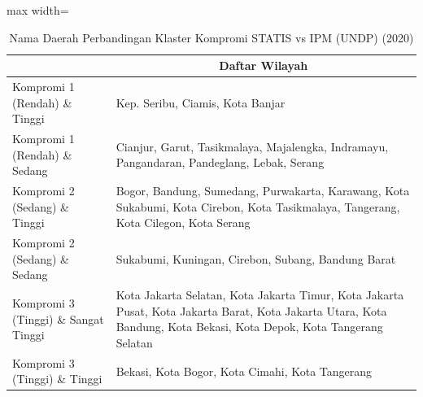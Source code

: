 \begin{table}[H]
\centering
\caption{Nama Daerah Perbandingan Klaster Kompromi STATIS vs IPM (UNDP) (2020)} \label{tab:app2comp_ipm_name_2020}
\begin{adjustbox}{max width=\textwidth}
\begin{tabular}{|>{\centering\arraybackslash}p{4cm}|p{10cm}|}
\hline
\multicolumn{1}{|c|}{\textbf{Kategori}} & \multicolumn{1}{c|}{\textbf{Daftar Wilayah}} \\
\hline
Kompromi 1 (Rendah) \& Tinggi & Kep. Seribu, Ciamis, Kota Banjar \\
\hline
Kompromi 1 (Rendah) \& Sedang & Cianjur, Garut, Tasikmalaya, Majalengka, Indramayu, Pangandaran, Pandeglang, Lebak, Serang \\
\hline
Kompromi 2 (Sedang) \& Tinggi & Bogor, Bandung, Sumedang, Purwakarta, Karawang, Kota Sukabumi, Kota Cirebon, Kota Tasikmalaya, Tangerang, Kota Cilegon, Kota Serang \\
\hline
Kompromi 2 (Sedang) \& Sedang & Sukabumi, Kuningan, Cirebon, Subang, Bandung Barat \\
\hline
Kompromi 3 (Tinggi) \& Sangat Tinggi & Kota Jakarta Selatan, Kota Jakarta Timur, Kota Jakarta Pusat, Kota Jakarta Barat, Kota Jakarta Utara, Kota Bandung, Kota Bekasi, Kota Depok, Kota Tangerang Selatan \\
\hline
Kompromi 3 (Tinggi) \& Tinggi & Bekasi, Kota Bogor, Kota Cimahi, Kota Tangerang \\
\hline
\end{tabular}
\end{adjustbox}
\end{table}